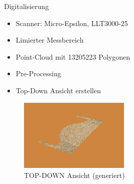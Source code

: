 \documentclass[../slides.tex]{subfiles}
\begin{document}
\begin{frame}{Digitalisierung}
    \begin{minipage}[]{.49\textwidth}
      \begin{itemize}
        \item Scanner: Micro-Epsilon, LLT3000-25
        \item Limierter Messbereich
        \item Point-Cloud mit 13205223 Polygonen
        \item Pre-Processing
        \item Top-Down Ansicht erstellen
      \end{itemize}
    \end{minipage}
    \hfill
    \begin{minipage}[h]{.49\textwidth}
      \begin{figure}[]
        \includegraphics[width=150pt]{img_niklas/base_scan.png}
        \caption[short]{TOP-DOWN Ansicht (generiert)}
      \end{figure}
    \end{minipage}
  \end{frame}
\end{document}
